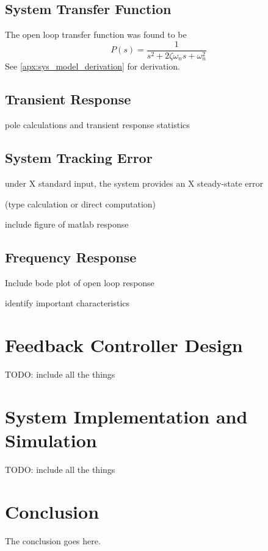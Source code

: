 \documentclass[conference,onecolumn]{IEEEtran}
\begin{document}
\subsection{System Transfer Function}
The open loop transfer function was found to be 
\begin{equation}
    P(s) = \frac{1}{s^2 + 2 \zeta \omega_n s + \omega_n^2}
\end{equation}
See \autoref{apx:sys_model_derivation} for derivation.

\subsection{Transient Response}

pole calculations and transient response statistics

\subsection{System Tracking Error}

under X standard input, the system provides an X steady-state error

(type calculation or direct computation)

include figure of matlab response

\subsection{Frequency Response}
Include bode plot of open loop response

identify important characteristics


\section{Feedback Controller Design}


TODO: include all the things


\section{System Implementation and Simulation}



TODO: include all the things



\section{Conclusion}
The conclusion goes here.
\end{document}
